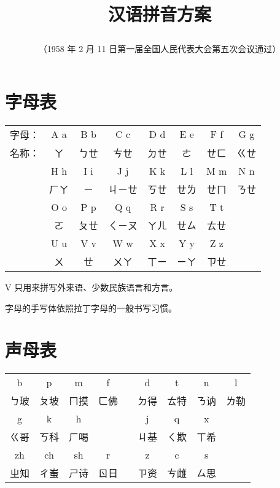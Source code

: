 \documentclass[zihao=-4,fontset=none]{ctexart}
\title{\huge\sffamily
  \begin{CJKfilltwosides}{8em}
    汉语拼音方案
  \end{CJKfilltwosides}}
\author{\normalsize\kaishu
  （1958 年 2 月 11 日第一届全国人民代表大会第五次会议通过）}
\date{}
\def\bopomofov{\textit{\symbol{"4E07}}}
\begin{document}
\maketitle

\section{字母表}

\begin{center}
  \begin{tabular}{*{8}{c}}
    \textsf{字母：} & A a  & B b  & C c    & D d  & E e  & F f  & G g  \\
    \textsf{名称：} & ㄚ   & ㄅㄝ & ㄘㄝ   & ㄉㄝ & ㄜ   & ㄝㄈ & ㄍㄝ \\
    \cline{2-8}
                    & H h  & I i  & J j    & K k  & L l  & M m  & N n  \\
                    & ㄏㄚ & ㄧ   & ㄐㄧㄝ & ㄎㄝ & ㄝㄌ & ㄝㄇ & ㄋㄝ \\
    \cline{2-8}
                    & O o  & P p  & Q q    & R r  & S s  & T t  & \\
                    & ㄛ   & ㄆㄝ & ㄑㄧㄡ & ㄚㄦ & ㄝㄙ & ㄊㄝ & \\
    \cline{2-7}
                    & U u  & V v  & W w    & X x  & Y y  & Z z  & \\
                    & ㄨ   & \bopomofov ㄝ & ㄨㄚ   & ㄒㄧ & ㄧㄚ & ㄗㄝ &
  \end{tabular}
\end{center}

V 只用来拼写外来语、少数民族语言和方言。

字母的手写体依照拉丁字母的一般书写习惯。

\section{声母表}

\begin{center}
  \begin{tabular}{*{9}{c}}
    b    & p    & m    & f    &  & d    & t    & n    & l    \\
    ㄅ玻 & ㄆ坡 & ㄇ摸 & ㄈ佛 &  & ㄉ得 & ㄊ特 & ㄋ讷 & ㄌ勒 \\
    \hline
    g    & k    & h    &      &  & j    & q    & x    &      \\
    ㄍ哥 & ㄎ科 & ㄏ喝 &      &  & ㄐ基 & ㄑ欺 & ㄒ希 &      \\
    \hline
    zh   & ch   & sh   & r    &  & z    & c    & s    &      \\
    ㄓ知 & ㄔ蚩 & ㄕ诗 & ㄖ日 &  & ㄗ资 & ㄘ雌 & ㄙ思 &
  \end{tabular}
\end{center}
\end{document}
